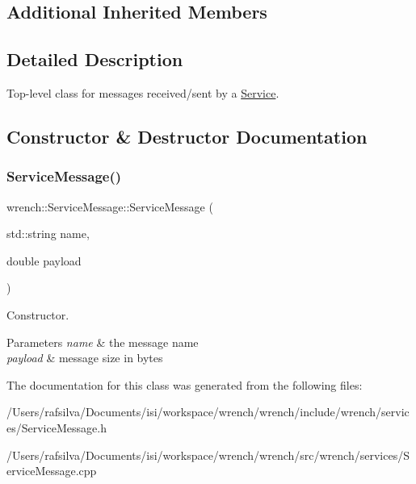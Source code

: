 \subsection*{Additional Inherited Members}


\subsection{Detailed Description}
Top-\/level class for messages received/sent by a \hyperlink{classwrench_1_1_service}{Service}. 

\subsection{Constructor \& Destructor Documentation}
\mbox{\label{classwrench_1_1_service_message_ae0ee642edc65da18c7d5932dc20f9750}} 
\subsubsection{\texorpdfstring{Service\+Message()}{ServiceMessage()}}
{\footnotesize\ttfamily wrench\+::\+Service\+Message\+::\+Service\+Message (\begin{DoxyParamCaption}\item[{std\+::string}]{name,  }\item[{double}]{payload }\end{DoxyParamCaption})\hspace{0.3cm}{\ttfamily [protected]}}



Constructor. 


\begin{DoxyParams}{Parameters}
{\em name} & the message name \\
\hline
{\em payload} & message size in bytes \\
\hline
\end{DoxyParams}


The documentation for this class was generated from the following files\+:\begin{DoxyCompactItemize}
\item 
/\+Users/rafsilva/\+Documents/isi/workspace/wrench/wrench/include/wrench/services/Service\+Message.\+h\item 
/\+Users/rafsilva/\+Documents/isi/workspace/wrench/wrench/src/wrench/services/Service\+Message.\+cpp\end{DoxyCompactItemize}
